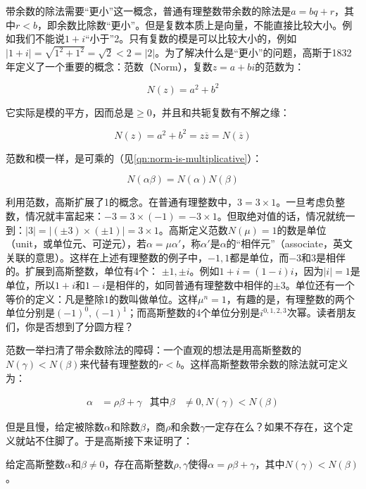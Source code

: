 \documentclass[b5paper]{ctexart}
\begin{document}
带余数的除法需要“更小”这一概念，普通有理整数带余数的除法是$a = bq + r$，其中$r < b$，即余数比除数“更小”。但是复数本质上是向量，不能直接比较大小。例如我们不能说$1 + i$“小于”2。只有复数的模是可以比较大小的，例如$|1 + i| = \sqrt{1^2 + 1^2} = \sqrt{2} < 2 = |2|$。为了解决什么是“更小”的问题，高斯于1832年定义了一个重要的概念：范数（Norm），复数$z = a + bi$的范数为：

\[
N(z) = a^2 + b^2
\]

它实际是模的平方，因而总是$\geq 0$，并且和共轭复数有不解之缘：

\[
N(z) = a^2 + b^2 = z\overline{z} = N(\overline{z})
\]

范数和模一样，是可乘的（见\cref{qn:norm-is-multiplicative}）：

\[
N(\alpha\beta) = N(\alpha)N(\beta)
\]

 
利用范数，高斯扩展了1的概念。在普通有理整数中，$3 = 3 \times 1$。一旦考虑负整数，情况就丰富起来：$-3 = 3 \times (-1) = -3 \times 1$。但取绝对值的话，情况就统一到：$|3| = |(\pm 3) \times (\pm 1)| = 3 \times 1$。高斯定义范数$N(\mu) = 1$的数是单位（unit，或单位元、可逆元），若$\alpha = \mu \alpha'$，称$\alpha'$是$\alpha$的“相伴元”（associate，英文关联的意思）。这样在上述有理整数的例子中，$-1, 1$都是单位，而$-3$和3是相伴的。扩展到高斯整数，单位有4个：
$\pm 1, \pm i$。例如$1 + i = (1 - i)i$，因为$|i| = 1$是单位，所以$1 + i$和$1 - i$是相伴的，如同普通有理整数中相伴的$\pm 3$。单位还有一个等价的定义：凡是整除1的数叫做单位。这样$\mu^n = 1$，有趣的是，有理整数的两个单位分别是$(-1)^0, (-1)^1$；而高斯整数的4个单位分别是$i^{0, 1, 2, 3}$次幂。读者朋友们，你是否想到了分圆方程？

范数一举扫清了带余数除法的障碍：一个直观的想法是用高斯整数的$N(\gamma) < N(\beta)$来代替有理整数的$r < b$。这样高斯整数带余数的除法就可定义为：

\begin{align*}
\alpha &= \rho \beta + \gamma & \text{其中} \beta &\ne 0, N(\gamma) < N(\beta)
\end{align*}

但是且慢，给定被除数$\alpha$和除数$\beta$，商$\rho$和余数$\gamma$一定存在么？如果不存在，这个定义就站不住脚了。于是高斯接下来证明了：

\begin{theorem}
给定高斯整数$\alpha$和$\beta \ne 0$，存在高斯整数$\rho, \gamma$使得$\alpha = \rho \beta + \gamma$，其中$N(\gamma) < N(\beta)$。
\end{theorem}
\end{document}
